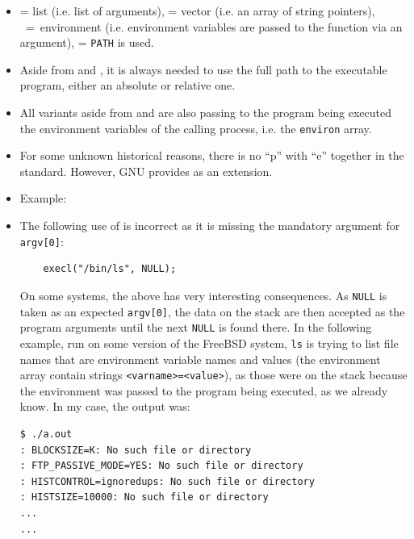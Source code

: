 \begin{itemize}
\item {} = list (i.e. list of arguments),  = vector (i.e.  an array
of string pointers), ~=~environment (i.e. environment variables are
passed to the function via an argument),  = \texttt{PATH} is used.
\item Aside from  and , it is always needed to use
the full path to the executable program, either an absolute or relative one.
\item All variants aside from  and 
are also passing to the program being executed the environment variables of the
calling process, i.e. the \texttt{environ} array.
\item For some unknown historical reasons, there is no ``p'' with ``e'' together
in the standard.  However, GNU provides  as an extension.
\item \label{EXEC_DATE} Example: 
\item \label{EXECL} The following use of  is incorrect as it is
missing the mandatory argument for \texttt{argv[0]}:

\begin{verbatim}
	execl("/bin/ls", NULL);
\end{verbatim}

On some systems, the above has very interesting consequences.  As \texttt{NULL}
is taken as an expected \texttt{argv[0]}, the data on the stack are then
accepted as the program arguments until the next \texttt{NULL} is found there.
In the following example, run on some version of the FreeBSD system, \texttt{ls}
is trying to list file names that are environment variable names and values (the
environment array contain strings \texttt{<varname>=<value>}), as those were on
the stack because the environment was passed to the program being executed, as
we already know.  In my case, the output was:

\begin{verbatim}
$ ./a.out 
: BLOCKSIZE=K: No such file or directory
: FTP_PASSIVE_MODE=YES: No such file or directory
: HISTCONTROL=ignoredups: No such file or directory
: HISTSIZE=10000: No such file or directory
...
...
\end{verbatim}

\end{itemize}



